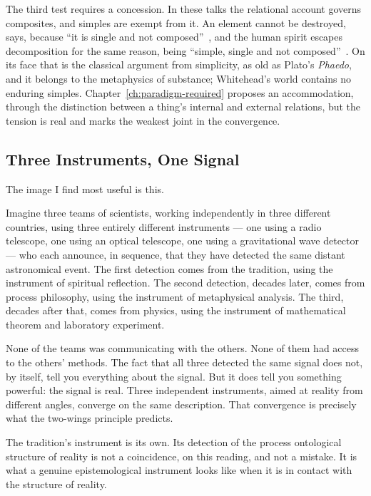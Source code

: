 The third test requires a concession.
In these talks the relational account governs composites, and simples are exempt
from it.
An element cannot be destroyed, \AbdulBaha says, because ``it is single and not
composed''~\citep[Talk 123]{PUP}, and the human spirit escapes decomposition for
the same reason, being ``simple, single and not composed''~\citep[Talk 100]{PUP}.
On its face that is the classical argument from simplicity, as old as Plato's
\textit{Phaedo}, and it belongs to the metaphysics of substance; Whitehead's world
contains no enduring simples.
Chapter~\ref{ch:paradigm-required} proposes an accommodation, through the
distinction between a thing's internal and external relations, but the tension
is real and marks the weakest joint in the convergence.

\subsection*{Three Instruments, One Signal}

The image I find most useful is this.

Imagine three teams of scientists, working independently in three different
countries, using three entirely different instruments --- one using a radio
telescope, one using an optical telescope, one using a gravitational wave detector
--- who each announce, in sequence, that they have detected the same distant
astronomical event.
The first detection comes from the \bahai tradition, using the instrument of
spiritual reflection.
The second detection, decades later, comes from process philosophy, using the
instrument of metaphysical analysis.
The third, decades after that, comes from physics, using the instrument of
mathematical theorem and laboratory experiment.

None of the teams was communicating with the others.
None of them had access to the others' methods.
The fact that all three detected the same signal does not, by itself, tell you
everything about the signal.
But it does tell you something powerful: the signal is real.
Three independent instruments, aimed at reality from different angles, converge on
the same description.
That convergence is precisely what the two-wings principle predicts.

The \bahai tradition's instrument is its own.
Its detection of the process ontological structure of reality is not a coincidence,
on this reading, and not a mistake.
It is what a genuine epistemological instrument looks like when it is in contact
with the structure of reality.



